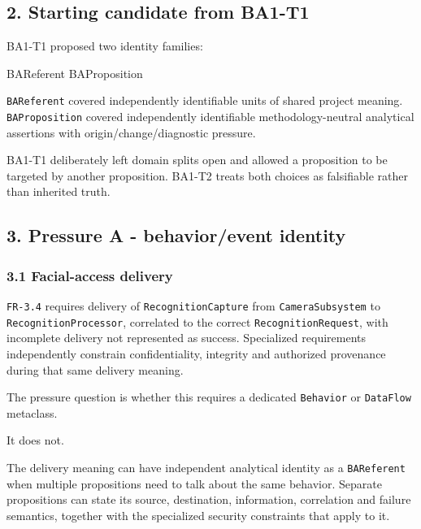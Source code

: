 \documentclass[
  10pt,
]{article}
\newenvironment{Shaded}{}{}
\newcommand{\NormalTok}[1]{#1}
\begin{document}
\subsection{2. Starting candidate from
BA1-T1}\label{starting-candidate-from-ba1-t1}

BA1-T1 proposed two identity families:

\begin{Shaded}
\begin{Highlighting}[]
\NormalTok{BAReferent}
\NormalTok{BAProposition}
\end{Highlighting}
\end{Shaded}

\texttt{BAReferent} covered independently identifiable units of shared
project meaning. \texttt{BAProposition} covered independently
identifiable methodology-neutral analytical assertions with
origin/change/diagnostic pressure.

BA1-T1 deliberately left domain splits open and allowed a proposition to
be targeted by another proposition. BA1-T2 treats both choices as
falsifiable rather than inherited truth.

\subsection{3. Pressure A - behavior/event
identity}\label{pressure-a---behaviorevent-identity}

\subsubsection{3.1 Facial-access delivery}\label{facial-access-delivery}

\texttt{FR-3.4} requires delivery of \texttt{RecognitionCapture} from
\texttt{CameraSubsystem} to \texttt{RecognitionProcessor}, correlated to
the correct \texttt{RecognitionRequest}, with incomplete delivery not
represented as success. Specialized requirements independently constrain
confidentiality, integrity and authorized provenance during that same
delivery meaning.

The pressure question is whether this requires a dedicated
\texttt{Behavior} or \texttt{DataFlow} metaclass.

It does not.

The delivery meaning can have independent analytical identity as a
\texttt{BAReferent} when multiple propositions need to talk about the
same behavior. Separate propositions can state its source, destination,
information, correlation and failure semantics, together with the
specialized security constraints that apply to it.
\end{document}
